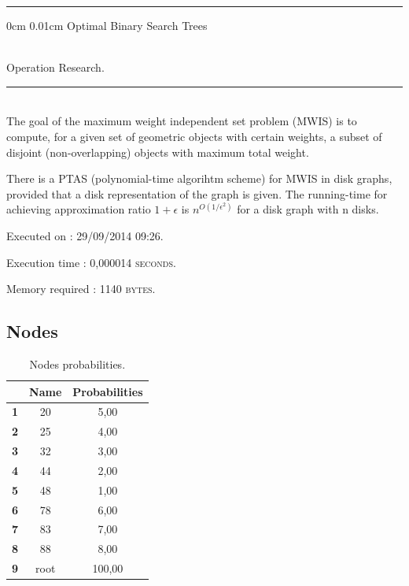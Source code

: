 \documentclass{article}
\makeatletter
\newcommand{\HRule}{\noindent\rule{\linewidth}{0.5mm}}
\renewcommand\section{\@startsection
  {section}{1}{0mm}%
  {0cm}%
  {0.01cm}%
  {\Huge\bfseries\color{black}}}%
\makeatother
\begin{document}
\HRule

\section{Optimal Binary Search Trees}

 \\[0.4cm]
{\LARGE Operation Research.}\\[0.4cm]
\HRule \\[0.5cm]
\indent The goal of the maximum weight independent set problem (MWIS) is to compute, for a given set of geometric objects with certain weights, a subset of disjoint (non-overlapping) objects with maximum total weight.

There is a PTAS (polynomial-time algorihtm scheme) for MWIS in disk graphs, provided that a disk representation of the graph is given. 
The running-time for achieving approximation ratio $1+\epsilon$ 
is $n^{O(1/\epsilon^{2})}$ for a disk graph with n disks.\\[0.5cm]
\begin{compactitem}
\item Executed on : \textsc{29/09/2014 09:26}. 
\item Execution time : \textsc{0,000014 seconds}. 
\item Memory required : \textsc{1140 bytes}. 
\end{compactitem}

\subsection{Nodes}
\begin{table}[!ht]
\centering
\begin{tabular}{c||c|c|}
\cline{2-3}
 & \cellcolor{gray90}\textbf{Name} & \cellcolor{gray90}\textbf{Probabilities}  \\
\hline\hline
\multicolumn{1}{|c||}{\cellcolor{gray90}\textbf{1}} & 20 & 5,00 \\ \hline
\multicolumn{1}{|c||}{\cellcolor{gray90}\textbf{2}} & 25 & 4,00 \\ \hline
\multicolumn{1}{|c||}{\cellcolor{gray90}\textbf{3}} & 32 & 3,00 \\ \hline
\multicolumn{1}{|c||}{\cellcolor{gray90}\textbf{4}} & 44 & 2,00 \\ \hline
\multicolumn{1}{|c||}{\cellcolor{gray90}\textbf{5}} & 48 & 1,00 \\ \hline
\multicolumn{1}{|c||}{\cellcolor{gray90}\textbf{6}} & 78 & 6,00 \\ \hline
\multicolumn{1}{|c||}{\cellcolor{gray90}\textbf{7}} & 83 & 7,00 \\ \hline
\multicolumn{1}{|c||}{\cellcolor{gray90}\textbf{8}} & 88 & 8,00 \\ \hline
\multicolumn{1}{|c||}{\cellcolor{gray90}\textbf{9}} & root & 100,00 \\ \hline
\end{tabular}
\caption{Nodes probabilities.}
\end{table}
\end{document}
